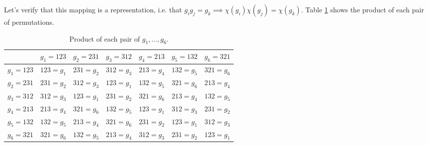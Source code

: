 \documentclass[12pt]{extarticle}
\begin{document}
Let's verify that this mapping is a representation, i.e. that $g_ig_j = g_k \implies \chi(g_i)\chi(g_j) = \chi(g_k)$.
Table \ref{tab:permutationproducts} shows the product of each pair of permutations.
\begin{table}[h!]
    \centering
    \begin{footnotesize}
        \begin{tabular}{c|c|c|c|c|c|c}
            & $g_1=123$ & $g_2=231$ & $g_3=312$ & $g_4=213$ & $g_5=132$ & $g_6=321$ \\
            \hline
            $g_1=123$ & $123=g_1$ & $231=g_2$ & $312=g_3$ & $213=g_4$ & $132=g_5$ & $321=g_6$ \\
            $g_2=231$ & $231=g_2$ & $312=g_3$ & $123=g_1$ & $132=g_5$ & $321=g_6$ & $213=g_4$ \\
            $g_3=312$ & $312=g_3$ & $123=g_1$ & $231=g_2$ & $321=g_6$ & $213=g_4$ & $132=g_5$ \\
            $g_4=213$ & $213=g_4$ & $321=g_6$ & $132=g_5$ & $123=g_1$ & $312=g_3$ & $231=g_2$ \\
            $g_5=132$ & $132=g_5$ & $213=g_4$ & $321=g_6$ & $231=g_2$ & $123=g_1$ & $312=g_3$ \\
            $g_6=321$ & $321=g_6$ & $132=g_5$ & $213=g_4$ & $312=g_3$ & $231=g_2$ & $123=g_1$ \\
        \end{tabular}
    \end{footnotesize}
    \caption{Product of each pair of $g_1, \ldots, g_6$.}
    \label{tab:permutationproducts}
\end{table}
\end{document}
